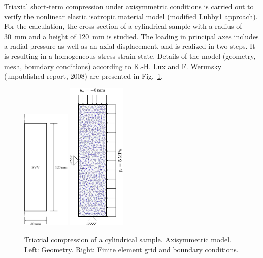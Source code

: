 Triaxial short-term compression under axisymmetric conditions is carried out to verify the nonlinear elastic isotropic material model (modified Lubby1 approach). For the calculation, the cross-section of a cylindrical sample with a radius of 30~mm and a height of 120~mm is studied. The loading in principal axes includes a radial pressure as well as an axial displacement, and is realized in two steps. It is resulting in a homogeneous stress-strain state. Details of the model (geometry, mesh, boundary conditions) according to K.-H. Lux and F. Werunsky (unpublished report, 2008) are presented in Fig.~\ref{triax_model_lubby1}.

\begin{figure}[!htb]
\begin{center}
\includegraphics[width=0.2\textwidth]{M/figure/svv_model.eps}
\hspace*{10.0ex}
\includegraphics[width=0.25\textwidth]{M/figure/svv_mesh.eps}
\end{center}
\caption{Triaxial compression of a cylindrical sample. Axisymmetric model. Left: Geometry. Right: Finite element grid and boundary conditions.} 
\label{triax_model_lubby1}
\end{figure}

